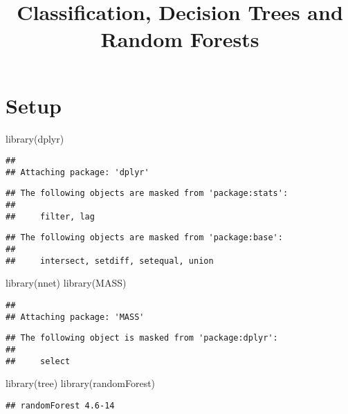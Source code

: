 \documentclass[
]{article}
\title{Classification, Decision Trees and Random Forests}
\author{}
\date{\vspace{-2.5em}}
\newenvironment{Shaded}{\begin{snugshade}}{\end{snugshade}}
\newcommand{\FunctionTok}[1]{\textcolor[rgb]{0.00,0.00,0.00}{#1}}
\newcommand{\NormalTok}[1]{#1}
\begin{document}
\maketitle

\hypertarget{setup}{%
\section{Setup}\label{setup}}

\begin{Shaded}
\begin{Highlighting}[]
\FunctionTok{library}\NormalTok{(dplyr)}
\end{Highlighting}
\end{Shaded}

\begin{verbatim}
## 
## Attaching package: 'dplyr'
\end{verbatim}

\begin{verbatim}
## The following objects are masked from 'package:stats':
## 
##     filter, lag
\end{verbatim}

\begin{verbatim}
## The following objects are masked from 'package:base':
## 
##     intersect, setdiff, setequal, union
\end{verbatim}

\begin{Shaded}
\begin{Highlighting}[]
\FunctionTok{library}\NormalTok{(nnet)}
\FunctionTok{library}\NormalTok{(MASS)}
\end{Highlighting}
\end{Shaded}

\begin{verbatim}
## 
## Attaching package: 'MASS'
\end{verbatim}

\begin{verbatim}
## The following object is masked from 'package:dplyr':
## 
##     select
\end{verbatim}

\begin{Shaded}
\begin{Highlighting}[]
\FunctionTok{library}\NormalTok{(tree)}
\FunctionTok{library}\NormalTok{(randomForest)}
\end{Highlighting}
\end{Shaded}

\begin{verbatim}
## randomForest 4.6-14
\end{verbatim}
\end{document}
